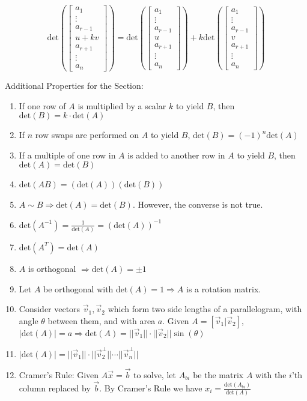 \documentclass[11pt]{article}
\begin{document}
$$\text{det}\left(\begin{bmatrix}
a_1\\
\vdots\\
a_{r-1}\\
u+kv\\
a_{r+1}\\
\vdots\\
a_n
\end{bmatrix}\right)=
\text{det}\left(\begin{bmatrix}
a_1\\
\vdots\\
a_{r-1}\\
u\\
a_{r+1}\\
\vdots\\
a_n
\end{bmatrix}\right)+
k\text{det}\left(\begin{bmatrix}
a_1\\
\vdots\\
a_{r-1}\\
v\\
a_{r+1}\\
\vdots\\
a_n
\end{bmatrix}\right)
$$

\noindent
Additional Properties for the Section:
\begin{enumerate}
\item If one row of $A$ is multiplied by a scalar $k$ to yield $B$, then $\text{det}(B)=k\cdot\text{det}(A)$
\item If $n$ row swaps are performed on $A$ to yield $B$, $\text{det}(B)=(-1)^n\text{det}(A)$
\item If a multiple of one row in $A$ is added to another row in $A$ to yield $B$, then $\text{det}(A)=\text{det}(B)$
\item det$(AB)=(\text{det}(A))(\text{det}(B))$
\item $A\sim B\Rightarrow \text{det}(A)=\text{det}(B)$. However, the converse is not true.
\item det$(A^{-1})=\frac{1}{\text{det}(A)}=(\text{det}(A))^{-1}$
\item det$(A^T)=\text{det}(A)$
\item $A$ is orthogonal $\Rightarrow\text{det}(A)=\pm 1$
\item Let $A$ be orthogonal with det$(A)=1\Rightarrow A$ is a rotation matrix.
\item Consider vectors $\vec{v}_1,\vec{v}_2$ which form two side lengths of a parallelogram, with angle $\theta$ between them, and with area $a$. Given $A=[\vec{v}_1|\vec{v}_2]$, $|\text{det}(A)|=a\Rightarrow \text{det}(A)=||\vec{v}_1||\cdot ||\vec{v}_2||\sin(\theta)$
\item $|\text{det}(A)|=||\vec{v}_1||\cdot||\vec{v}_2^\perp||\cdots ||\vec{v}_n^\perp||$
\item Cramer's Rule: Given $A\vec{x}=\vec{b}$ to solve, let $A_{bi}$ be the matrix $A$ with the $i$'th column replaced by $\vec{b}$. By Cramer's Rule we have $x_i=\frac{\text{det}(A_{bi})}{\text{det}(A)}$
\end{enumerate}
\end{document}
